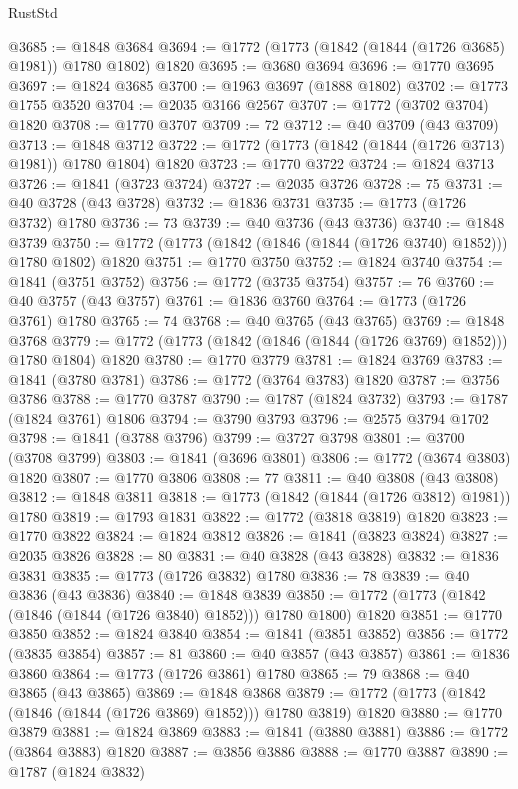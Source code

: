 \begin{lexlean}{RustStd}
\begin{coremodule}
@3685 := @1848 @3684
@3694 := @1772 (@1773 (@1842 (@1844 (@1726 @3685) @1981)) @1780 @1802) @1820
@3695 := @3680 @3694
@3696 := @1770 @3695
@3697 := @1824 @3685
@3700 := @1963 @3697 (@1888 @1802)
@3702 := @1773 @1755 @3520
@3704 := @2035 @3166 @2567
@3707 := @1772 (@3702 @3704) @1820
@3708 := @1770 @3707
@3709 := 72
@3712 := @40 @3709 (@43 @3709)
@3713 := @1848 @3712
@3722 := @1772 (@1773 (@1842 (@1844 (@1726 @3713) @1981)) @1780 @1804) @1820
@3723 := @1770 @3722
@3724 := @1824 @3713
@3726 := @1841 (@3723 @3724)
@3727 := @2035 @3726
@3728 := 75
@3731 := @40 @3728 (@43 @3728)
@3732 := @1836 @3731
@3735 := @1773 (@1726 @3732) @1780
@3736 := 73
@3739 := @40 @3736 (@43 @3736)
@3740 := @1848 @3739
@3750 := @1772 (@1773 (@1842 (@1846 (@1844 (@1726 @3740) @1852))) @1780 @1802) @1820
@3751 := @1770 @3750
@3752 := @1824 @3740
@3754 := @1841 (@3751 @3752)
@3756 := @1772 (@3735 @3754)
@3757 := 76
@3760 := @40 @3757 (@43 @3757)
@3761 := @1836 @3760
@3764 := @1773 (@1726 @3761) @1780
@3765 := 74
@3768 := @40 @3765 (@43 @3765)
@3769 := @1848 @3768
@3779 := @1772 (@1773 (@1842 (@1846 (@1844 (@1726 @3769) @1852))) @1780 @1804) @1820
@3780 := @1770 @3779
@3781 := @1824 @3769
@3783 := @1841 (@3780 @3781)
@3786 := @1772 (@3764 @3783) @1820
@3787 := @3756 @3786
@3788 := @1770 @3787
@3790 := @1787 (@1824 @3732)
@3793 := @1787 (@1824 @3761) @1806
@3794 := @3790 @3793
@3796 := @2575 @3794 @1702
@3798 := @1841 (@3788 @3796)
@3799 := @3727 @3798
@3801 := @3700 (@3708 @3799)
@3803 := @1841 (@3696 @3801)
@3806 := @1772 (@3674 @3803) @1820
@3807 := @1770 @3806
@3808 := 77
@3811 := @40 @3808 (@43 @3808)
@3812 := @1848 @3811
@3818 := @1773 (@1842 (@1844 (@1726 @3812) @1981)) @1780
@3819 := @1793 @1831
@3822 := @1772 (@3818 @3819) @1820
@3823 := @1770 @3822
@3824 := @1824 @3812
@3826 := @1841 (@3823 @3824)
@3827 := @2035 @3826
@3828 := 80
@3831 := @40 @3828 (@43 @3828)
@3832 := @1836 @3831
@3835 := @1773 (@1726 @3832) @1780
@3836 := 78
@3839 := @40 @3836 (@43 @3836)
@3840 := @1848 @3839
@3850 := @1772 (@1773 (@1842 (@1846 (@1844 (@1726 @3840) @1852))) @1780 @1800) @1820
@3851 := @1770 @3850
@3852 := @1824 @3840
@3854 := @1841 (@3851 @3852)
@3856 := @1772 (@3835 @3854)
@3857 := 81
@3860 := @40 @3857 (@43 @3857)
@3861 := @1836 @3860
@3864 := @1773 (@1726 @3861) @1780
@3865 := 79
@3868 := @40 @3865 (@43 @3865)
@3869 := @1848 @3868
@3879 := @1772 (@1773 (@1842 (@1846 (@1844 (@1726 @3869) @1852))) @1780 @3819) @1820
@3880 := @1770 @3879
@3881 := @1824 @3869
@3883 := @1841 (@3880 @3881)
@3886 := @1772 (@3864 @3883) @1820
@3887 := @3856 @3886
@3888 := @1770 @3887
@3890 := @1787 (@1824 @3832)

\end{coremodule}
\end{lexlean}
